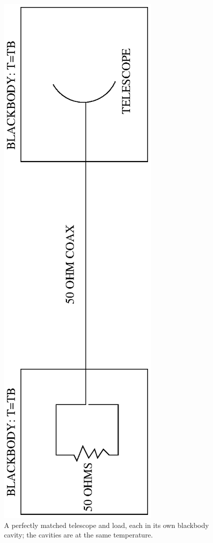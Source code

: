 \documentclass[psfig,preprint]{aastex}
\begin{document}
\begin{figure}[h!]
\begin{center}
\includegraphics[scale=.55, angle=-90]{fount2.ps}
\end{center}
\caption{A perfectly matched telescope and load, each in its own blackbody
cavity; the cavities are at the same temperature.\label{fount2}}
\end{figure}
\end{document}
